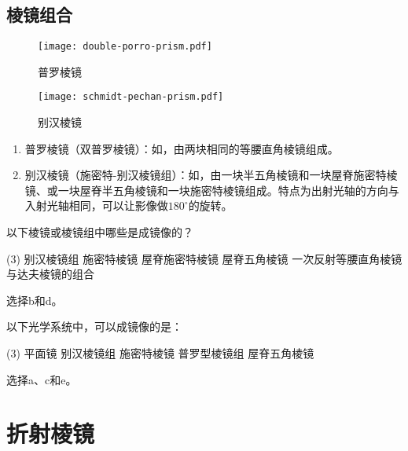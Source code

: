 \documentclass[cn,10pt,chinesefont=founder,math=newtx,cite=super,twoside]{elegantbook}
\begin{document}
\subsection{棱镜组合}

\begin{figure}[htbp]
	\centering
	\begin{minipage}[t]{0.45\textwidth}
		\centering
		\texttt{[image: double-porro-prism.pdf]}
		\caption{普罗棱镜}
		\label{fig:double-porro-prism}
	\end{minipage}
	\qquad
	\begin{minipage}[t]{0.45\textwidth}
		\centering
		\texttt{[image: schmidt-pechan-prism.pdf]}
		\caption{别汉棱镜}
		\label{fig:schmidt-pechan-prism}
	\end{minipage}
\end{figure}

\begin{enumerate}
	\item 普罗棱镜（双普罗棱镜）：如，由两块相同的等腰直角棱镜组成。
	\item 别汉棱镜（施密特-别汉棱镜组）：如，由一块半五角棱镜和一块屋脊施密特棱镜、或一块屋脊半五角棱镜和一块施密特棱镜组成。特点为出射光轴的方向与入射光轴相同，可以让影像做$180^{\circ}$的旋转。
\end{enumerate}

\begin{problem}
	以下棱镜或棱镜组中哪些是成镜像的？
	\begin{tasks}(3)
		\task 别汉棱镜组
		\task 施密特棱镜
		\task 屋脊施密特棱镜
		\task 屋脊五角棱镜
		\task* 一次反射等腰直角棱镜与达夫棱镜的组合
	\end{tasks}
\end{problem}
\begin{solution}
	选择b和d。
\end{solution}

\begin{problem}
	以下光学系统中，可以成镜像的是：
	\begin{tasks}(3)
		\task 平面镜
		\task 别汉棱镜组
		\task 施密特棱镜
		\task 普罗型棱镜组
		\task 屋脊五角棱镜
	\end{tasks}
\end{problem}
\begin{solution}
	选择a、c和e。
\end{solution}

\section{折射棱镜}
\end{document}
